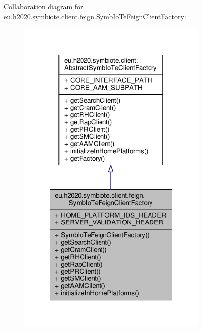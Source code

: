 Collaboration diagram for eu.\+h2020.\+symbiote.\+client.\+feign.\+Symb\+Io\+Te\+Feign\+Client\+Factory\+:\nopagebreak
\begin{figure}[H]
\begin{center}
\leavevmode
\includegraphics[width=264pt]{classeu_1_1h2020_1_1symbiote_1_1client_1_1feign_1_1SymbIoTeFeignClientFactory__coll__graph}
\end{center}
\end{figure}
